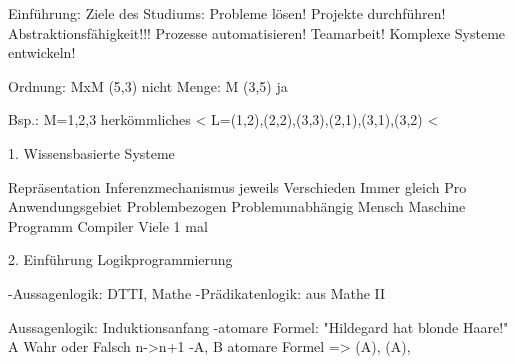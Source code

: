 \documentclass[11pt]{scrartcl}
\begin{document}
Einführung:
Ziele des Studiums:
Probleme lösen!
Projekte durchführen!
Abstraktionsfähigkeit!!!
Prozesse automatisieren!
Teamarbeit!
Komplexe Systeme entwickeln!

Ordnung: \leq \subsetneq MxM		(5,3) nicht
Menge: M							(3,5) ja

Bsp.: M={1,2,3} herkömmliches <
	  L={(1,2),(2,2),(3,3),(2,1),(3,1),(3,2)} \cup <
	  
	  
	  
1. Wissensbasierte Systeme

Repräsentation			Inferenzmechanismus
jeweils Verschieden		Immer gleich
Pro Anwendungsgebiet
Problembezogen			Problemunabhängig
Mensch					Maschine
Programm				Compiler
Viele					1 mal

2. Einführung Logikprogrammierung

-Aussagenlogik: DTTI, Mathe
-Prädikatenlogik: aus Mathe II

Aussagenlogik:
Induktionsanfang -atomare Formel: "Hildegard hat blonde Haare!" \widehat{=} A Wahr oder Falsch
n->n+1			 -A, B atomare Formel => (A\lorB), (A\landB), \lnotA
\end{document}
